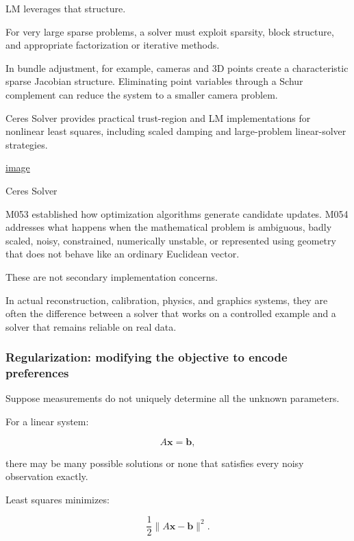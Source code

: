 LM leverages that structure.

For very large sparse problems, a solver must exploit sparsity, block structure, and appropriate factorization or iterative methods.

In bundle adjustment, for example, cameras and 3D points create a characteristic sparse Jacobian structure. Eliminating point variables through a Schur complement can reduce the system to a smaller camera problem.

Ceres Solver provides practical trust-region and LM implementations for nonlinear least squares, including scaled damping and large-problem linear-solver strategies. 

\href{https://www.google.com/s2/favicons?domain=https://ceres-solver.readthedocs.io&sz=32}{image}

Ceres Solver

M053 established how optimization algorithms generate candidate updates. M054 addresses what happens when the mathematical problem is ambiguous, badly scaled, noisy, constrained, numerically unstable, or represented using geometry that does not behave like an ordinary Euclidean vector.

These are not secondary implementation concerns.

In actual reconstruction, calibration, physics, and graphics systems, they are often the difference between a solver that works on a controlled example and a solver that remains reliable on real data.

\subsubsection{Regularization: modifying the objective to encode preferences}\label{02-foundations-ii-ch027-regularization-modifying-the-objective-to-encode-preferences}

\hypertarget{02-foundations-ii-ch027-regularization-modifying-the-objective-to-encode-preferences}{}

Suppose measurements do not uniquely determine all the unknown parameters.

For a linear system:

\[
A\mathbf x=\mathbf b,
\]

there may be many possible solutions or none that satisfies every noisy observation exactly.

Least squares minimizes:

\[
\frac12\|A\mathbf x-\mathbf b\|^2.
\]


